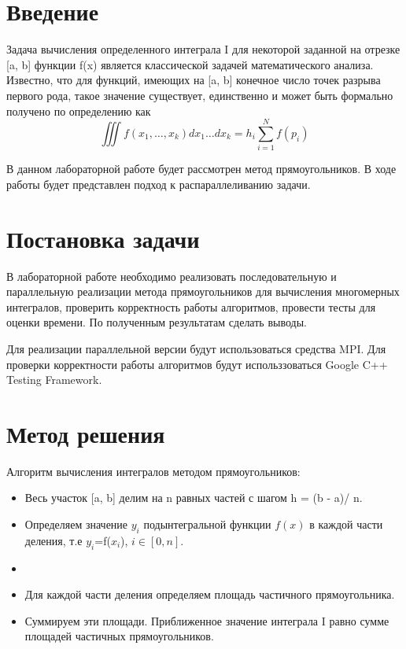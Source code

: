 \documentclass{report}
\begin{document}
\setcounter{page}{2}

\tableofcontents
\newpage

\section*{Введение}
Задача вычисления определенного интеграла I для некоторой заданной на отрезке [a, b] функции f(x) является классической задачей математического анализа. Известно, что для функций, имеющих на [a, b] конечное число точек разрыва первого рода, такое значение существует, единственно и может быть формально получено по определению как\\
\begin{equation}\iiint{f(x_1,\dots,x_k) dx_1 \dots dx_k} = h_i\sum_{i=1}^{N}{f(p_{i})} \end{equation}
\par В данном лабораторной работе будет рассмотрен метод прямоугольников. В ходе работы будет представлен подход к распараллеливанию задачи.
\newpage

\section*{Постановка задачи}
В лабораторной работе необходимо реализовать последовательную и параллельную реализации метода прямоугольников для вычисления многомерных интегралов, проверить корректность работы алгоритмов, провести тесты для оценки времени. По полученным результатам сделать выводы.
\par Для реализации параллельной версии будут использоваться средства MPI. Для проверки корректности работы алгоритмов будут использзоваться Google C++ Testing Framework.
\newpage

\section*{Метод решения}
Алгоритм вычисления интегралов методом прямоугольников:
\begin{itemize}
\item Весь участок [a, b] делим на n равных частей с шагом h = (b - a)/ n.
\item Определяем значение $y_i$ подынтегральной функции $f(x)$ в каждой части деления, т.е $y_i$=f($x_i$), $i\in[0, n]$.
\item
\item Для каждой части деления определяем площадь  частичного прямоугольника.
\item Суммируем эти площади. Приближенное значение интеграла I равно сумме площадей частичных прямоугольников.
\end{itemize}
\newpage
\end{document}

